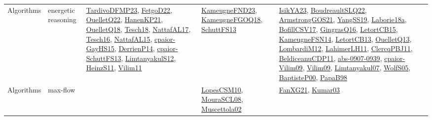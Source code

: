 {\begin{longtable}{lp{3cm}>{\raggedright}p{6cm}>{\raggedright}p{6cm}p{8cm}}
Algorithms & energetic reasoning & \href{papers/TardivoDFMP23.pdf}{TardivoDFMP23}\cite{TardivoDFMP23}, \href{articles/FetgoD22.pdf}{FetgoD22}\cite{FetgoD22}, \href{papers/OuelletQ22.pdf}{OuelletQ22}\cite{OuelletQ22}, \href{papers/HanenKP21.pdf}{HanenKP21}\cite{HanenKP21}, \href{papers/OuelletQ18.pdf}{OuelletQ18}\cite{OuelletQ18}, \href{papers/Tesch18.pdf}{Tesch18}\cite{Tesch18}, \href{articles/NattafAL17.pdf}{NattafAL17}\cite{NattafAL17}, \href{papers/Tesch16.pdf}{Tesch16}\cite{Tesch16}, \href{articles/NattafAL15.pdf}{NattafAL15}\cite{NattafAL15}, \href{papers/cpaior-GayHS15.pdf}{cpaior-GayHS15}\cite{cpaior-GayHS15}, \href{papers/DerrienP14.pdf}{DerrienP14}\cite{DerrienP14}, \href{papers/cpaior-SchuttFS13.pdf}{cpaior-SchuttFS13}\cite{cpaior-SchuttFS13}, \href{articles/LimtanyakulS12.pdf}{LimtanyakulS12}\cite{LimtanyakulS12}, \href{papers/HeinzS11.pdf}{HeinzS11}\cite{HeinzS11}, \href{papers/Vilim11.pdf}{Vilim11}\cite{Vilim11} & \href{papers/KameugneFND23.pdf}{KameugneFND23}\cite{KameugneFND23}, \href{papers/KameugneFGOQ18.pdf}{KameugneFGOQ18}\cite{KameugneFGOQ18}, \href{papers/SchuttFS13.pdf}{SchuttFS13}\cite{SchuttFS13} & \href{articles/IsikYA23.pdf}{IsikYA23}\cite{IsikYA23}, \href{papers/BoudreaultSLQ22.pdf}{BoudreaultSLQ22}\cite{BoudreaultSLQ22}, \href{papers/ArmstrongGOS21.pdf}{ArmstrongGOS21}\cite{ArmstrongGOS21}, \href{papers/YangSS19.pdf}{YangSS19}\cite{YangSS19}, \href{papers/Laborie18a.pdf}{Laborie18a}\cite{Laborie18a}, \href{papers/BofillCSV17.pdf}{BofillCSV17}\cite{BofillCSV17}, \href{papers/GingrasQ16.pdf}{GingrasQ16}\cite{GingrasQ16}, \href{articles/LetortCB15.pdf}{LetortCB15}\cite{LetortCB15}, \href{articles/KameugneFSN14.pdf}{KameugneFSN14}\cite{KameugneFSN14}, \href{papers/LetortCB13.pdf}{LetortCB13}\cite{LetortCB13}, \href{papers/OuelletQ13.pdf}{OuelletQ13}\cite{OuelletQ13}, \href{articles/LombardiM12.pdf}{LombardiM12}\cite{LombardiM12}, \href{papers/LahimerLH11.pdf}{LahimerLH11}\cite{LahimerLH11}, \href{papers/ClercqPBJ11.pdf}{ClercqPBJ11}\cite{ClercqPBJ11}, \href{articles/BeldiceanuCDP11.pdf}{BeldiceanuCDP11}\cite{BeldiceanuCDP11}, \href{articles/abs-0907-0939.pdf}{abs-0907-0939}\cite{abs-0907-0939}, \href{papers/cpaior-Vilim09.pdf}{cpaior-Vilim09}\cite{cpaior-Vilim09}, \href{papers/Vilim09.pdf}{Vilim09}\cite{Vilim09}, \href{papers/Limtanyakul07.pdf}{Limtanyakul07}\cite{Limtanyakul07}, \href{papers/WolfS05.pdf}{WolfS05}\cite{WolfS05}, \href{articles/BaptisteP00.pdf}{BaptisteP00}\cite{BaptisteP00}, \href{articles/PapaB98.pdf}{PapaB98}\cite{PapaB98}\\
Algorithms & max-flow &  & \href{articles/LopesCSM10.pdf}{LopesCSM10}\cite{LopesCSM10}, \href{papers/MouraSCL08.pdf}{MouraSCL08}\cite{MouraSCL08}, \href{papers/Muscettola02.pdf}{Muscettola02}\cite{Muscettola02} & \href{articles/FanXG21.pdf}{FanXG21}\cite{FanXG21}, \href{papers/Kumar03.pdf}{Kumar03}\cite{Kumar03}\\

\end{longtable}}
